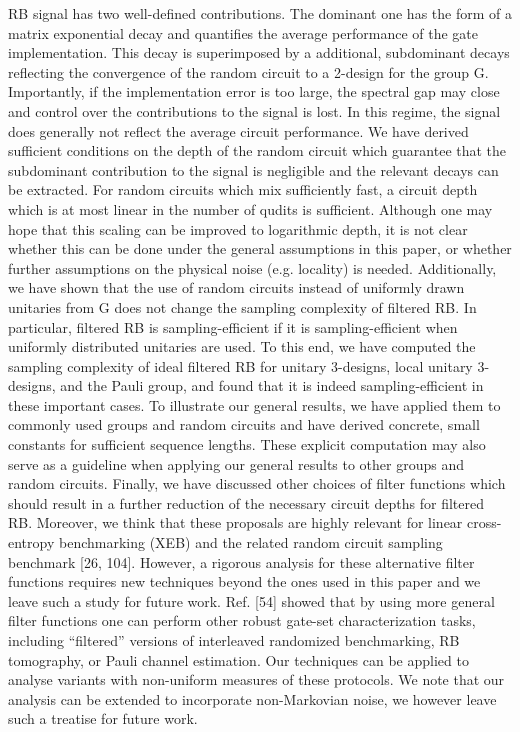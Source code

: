 RB signal has two well-defined contributions. The dominant one has the form of a matrix exponential decay and quantifies the average performance of the gate implementation. This decay is superimposed by a additional, subdominant decays reflecting the convergence of the random circuit to a 2-design for the group G. Importantly, if the implementation error is too large, the spectral gap may close and control over the contributions to the signal is lost. In this regime, the signal does generally not reflect the average circuit performance. We have derived sufficient conditions on the depth of the random circuit which guarantee that the subdominant contribution to the signal is negligible and the relevant decays can be extracted. For random circuits which mix sufficiently fast, a circuit depth which is at most linear in the number of qudits is sufficient. Although one may hope that this scaling can be improved to logarithmic depth, it is not clear whether this can be done under the general assumptions in this paper, or whether further assumptions on the physical noise (e.g. locality) is needed. Additionally, we have shown that the use of random circuits instead of uniformly drawn unitaries from G does not change the sampling complexity of filtered RB. In particular, filtered RB is sampling-efficient if it is sampling-efficient when uniformly distributed unitaries are used. To this end, we have computed the sampling complexity of ideal filtered RB for unitary 3-designs, local unitary 3-designs, and the Pauli group, and found that it is indeed sampling-efficient in these important cases. To illustrate our general results, we have applied them to commonly used groups and random circuits and have derived concrete, small constants for sufficient sequence lengths. These explicit computation may also serve as a guideline when applying our general results to other groups and random circuits. Finally, we have discussed other choices of filter functions which should result in a further reduction of the necessary circuit depths for filtered RB. Moreover, we think that these proposals are highly relevant for linear cross-entropy benchmarking (XEB) and the related random circuit sampling benchmark [26, 104]. However, a rigorous analysis for these alternative filter functions requires new techniques beyond the ones used in this paper and we leave such a study for future work. Ref. [54] showed that by using more general filter functions one can perform other robust gate-set characterization tasks, including “filtered” versions of interleaved randomized benchmarking, RB tomography, or Pauli channel estimation. Our techniques can be applied to analyse variants with non-uniform measures of these protocols. We note that our analysis can be extended to incorporate non-Markovian noise, we however leave such a treatise for future work.